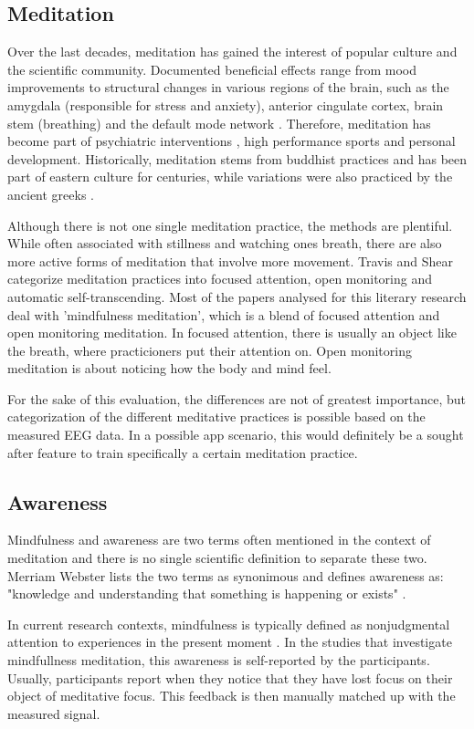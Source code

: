 \documentclass{llncs} %
\begin{document}
\subsection{Meditation}
Over the last decades, meditation has gained the interest of popular culture and the scientific community.
Documented beneficial effects range from mood improvements to structural changes \cite{Davidson} in various regions of the brain, such as the amygdala (responsible for stress and anxiety), anterior cingulate cortex, brain stem (breathing)
and the default mode network \cite{Tang:et al}.
Therefore, meditation has become part of psychiatric interventions \cite{Hoelzel}, high performance sports and personal development.
Historically, meditation stems from buddhist practices and has been part of eastern culture for centuries, while variations were also practiced by the ancient greeks \cite{Hadot:Davidson}.
\medskip

Although there is not one single meditation practice, the methods are plentiful. While often associated with stillness and watching ones breath,
there are also more active forms of meditation that involve more movement. Travis and Shear categorize meditation practices into focused attention, open monitoring and automatic self-transcending.\cite{Travis} 
Most of the papers analysed for this literary research deal with 'mindfulness meditation', which is a blend of focused attention and open monitoring meditation. In focused attention, there is usually an object like the breath, where practicioners put their attention on. Open monitoring meditation is about noticing how the body and mind feel.
\medskip

For the sake of this evaluation, the differences are not of greatest importance, but categorization of the different meditative practices is possible based on the measured EEG data. In a possible app scenario, this would definitely be a sought after feature to train specifically a certain meditation practice.
\subsection{Awareness}
Mindfulness and awareness are two terms often mentioned in the context of meditation and there is no single scientific definition to separate these two. Merriam Webster lists the two terms as synonimous and defines awareness as: "knowledge and understanding that something is happening or exists" \cite{Merriam:Webster}. 
\medskip

In current research contexts, mindfulness is typically defined as nonjudgmental attention to experiences in the present moment \cite{Kabat-Zinn}. In the studies that investigate mindfullness meditation, this awareness is self-reported by the participants. Usually, participants report when they notice that they have lost focus on their object of meditative focus. This feedback is then manually matched up with the measured signal.
\newpage
\end{document}

